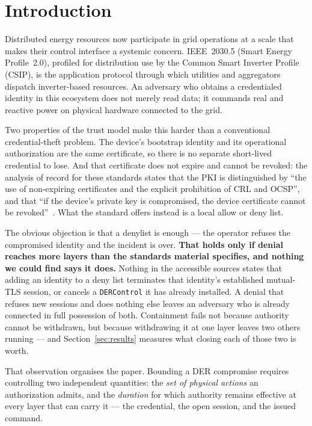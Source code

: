 \section{Introduction}

Distributed energy resources now participate in grid operations at a scale that makes their
control interface a systemic concern. IEEE~2030.5 (Smart Energy Profile~2.0), profiled for
distribution use by the Common Smart Inverter Profile (CSIP), is the application protocol through
which utilities and aggregators dispatch inverter-based resources. An adversary who obtains a
credentialed identity in this ecosystem does not merely read data; it commands real and reactive
power on physical hardware connected to the grid.

Two properties of the trust model make this harder than a conventional credential-theft problem.
The device's bootstrap identity and its operational authorization are the same certificate, so
there is no separate short-lived credential to lose. And that certificate does not expire and
cannot be revoked: the analysis of record for these standards states that the PKI is distinguished
by ``the use of non-expiring certificates and the explicit prohibition of CRL and OCSP'', and that
``if the device's private key is compromised, the device certificate cannot be
revoked''~\cite{obert2019recommendations}. What the standard offers instead is a local allow or
deny list.

The obvious objection is that a denylist is enough --- the operator refuses the compromised
identity and the incident is over. \textbf{That holds only if denial reaches more layers than the
standards material specifies, and nothing we could find says it does.} Nothing in the accessible
sources states that adding an identity to a deny list terminates that identity's established
mutual-TLS session, or cancels a \texttt{DERControl} it has already installed. A denial that
refuses new sessions and does nothing else leaves an adversary who is already connected in full
possession of both. Containment fails not because authority cannot be withdrawn, but because
withdrawing it at one layer leaves two others running --- and Section~\ref{sec:results} measures
what closing each of those two is worth.

That observation organises the paper. Bounding a DER compromise requires controlling two
independent quantities: the \emph{set of physical actions} an authorization admits, and the
\emph{duration} for which authority remains effective at every layer that can carry it --- the
credential, the open session, and the issued command.

